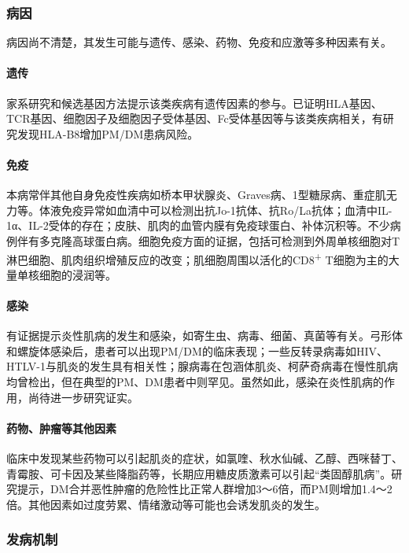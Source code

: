 \subsubsection{病因}

病因尚不清楚，其发生可能与遗传、感染、药物、免疫和应激等多种因素有关。

\paragraph{遗传}

家系研究和候选基因方法提示该类疾病有遗传因素的参与。已证明HLA基因、TCR基因、细胞因子及细胞因子受体基因、Fc受体基因等与该类疾病相关，有研究发现HLA-B8增加PM/DM患病风险。

\paragraph{免疫}

本病常伴其他自身免疫性疾病如桥本甲状腺炎、Graves病、1型糖尿病、重症肌无力等。体液免疫异常如血清中可以检测出抗Jo-1抗体、抗Ro/La抗体；血清中IL-1α、IL-2受体的存在；皮肤、肌肉的血管内膜有免疫球蛋白、补体沉积等。不少病例伴有多克隆高球蛋白病。细胞免疫方面的证据，包括可检测到外周单核细胞对T淋巴细胞、肌肉组织增殖反应的改变；肌细胞周围以活化的CD8\textsuperscript{+}
T细胞为主的大量单核细胞的浸润等。

\paragraph{感染}

有证据提示炎性肌病的发生和感染，如寄生虫、病毒、细菌、真菌等有关。弓形体和螺旋体感染后，患者可以出现PM/DM的临床表现；一些反转录病毒如HIV、HTLV-1与肌炎的发生具有相关性；腺病毒在包涵体肌炎、柯萨奇病毒在慢性肌病均曾检出，但在典型的PM、DM患者中则罕见。虽然如此，感染在炎性肌病的作用，尚待进一步研究证实。

\paragraph{药物、肿瘤等其他因素}

临床中发现某些药物可以引起肌炎的症状，如氯喹、秋水仙碱、乙醇、西咪替丁、青霉胺、可卡因及某些降脂药等，长期应用糖皮质激素可以引起“类固醇肌病”。研究提示，DM合并恶性肿瘤的危险性比正常人群增加3～6倍，而PM则增加1.4～2倍。其他因素如过度劳累、情绪激动等可能也会诱发肌炎的发生。

\subsubsection{发病机制}

